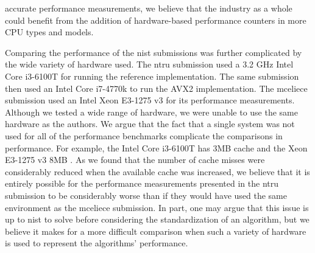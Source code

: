 accurate performance measurements, we believe that the industry as a whole could benefit from the addition of hardware-based performance counters in more CPU types and models.

Comparing the performance of the \gls{nist} submissions was further complicated by the wide variety of hardware used. The \gls{ntru} submission \cite{ntru2020} used a 3.2 GHz Intel Core i3-6100T for running the reference implementation. The same submission then used an Intel Core i7-4770k to run the AVX2 implementation. The \gls{mceliece} submission \cite{mceliece2020} used an Intel Xeon E3-1275 v3 for its performance measurements. Although we tested a wide range of hardware, we were unable to use the same hardware as the authors. We argue that the fact that a single system was not used for all of the performance benchmarks complicate the comparisons in performance. For example, the Intel Core i3-6100T has 3MB cache \cite{i36100t} and the Xeon E3-1275 v3 8MB \cite{xeon31275}. As we found that the number of cache misses were considerably reduced when the available cache was increased, we believe that it is entirely possible for the performance measurements presented in the \gls{ntru} submission to be considerably worse than if they would have used the same environment as the \gls{mceliece} submission. In part, one may argue that this issue is up to \gls{nist} to solve before considering the standardization of an algorithm, but we believe it makes for a more difficult comparison when such a variety of hardware is used to represent the algorithms' performance.


